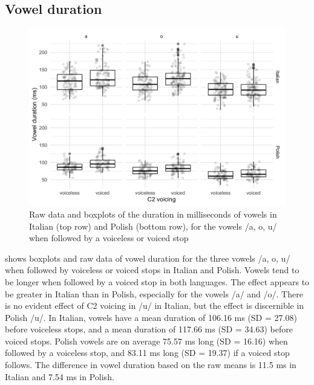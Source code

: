 \documentclass[charis]{glossa}
\begin{document}
\hypertarget{vowel-duration}{%
\subsection{Vowel duration}\label{vowel-duration}}

\label{s:vduration}

\begin{figure}
\includegraphics[width=\linewidth]{./Figure2} \caption{Raw data and boxplots of the duration in milliseconds of vowels in Italian (top row) and Polish (bottom row), for the vowels /a, o, u/ when followed by a voiceless or voiced stop}\label{f:Figure2}
\end{figure}

 shows boxplots and raw data of vowel duration for the
three vowels /a, o, u/ when followed by voiceless or voiced stops in
Italian and Polish. Vowels tend to be longer when followed by a voiced
stop in both languages. The effect appears to be greater in Italian than
in Polish, especially for the vowels /a/ and /o/. There is no evident
effect of C2 voicing in /u/ in Italian, but the effect is discernible in
Polish /u/. In Italian, vowels have a mean duration of 106.16 ms (SD =
27.08) before voiceless stops, and a mean duration of 117.66 ms (SD =
34.63) before voiced stops. Polish vowels are on average 75.57 ms long
(SD = 16.16) when followed by a voiceless stop, and 83.11 ms long (SD =
19.37) if a voiced stop follows. The difference in vowel duration based
on the raw means is 11.5 ms in Italian and 7.54 ms in Polish.
\end{document}
